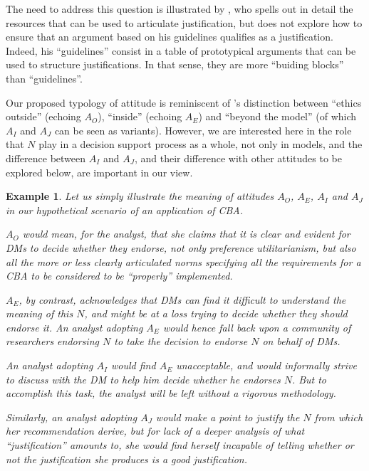 \documentclass[preprint, french, english, 11pt, authoryear]{elsarticle}%
\newtheorem{example}{Example}
\begin{document}
\begin{changebar}The need to address this question is illustrated by \citet{jackson_towards_1999}, who spells out in detail the resources that can be used to articulate justification, but does not explore how to ensure that an argument based on his guidelines qualifies as a justification.
Indeed, his ``guidelines'' consist in a table of prototypical arguments that can be used to structure justifications. In that sense, they are more ``buiding blocks'' than ``guidelines''.

Our proposed typology of attitude is reminiscent of \citet{le_menestrel_ethics_2004}'s distinction between ``ethics outside'' (echoing $A_O$), ``inside'' (echoing $A_E$) and ``beyond the model'' (of which $A_I$ and $A_J$ can be seen as variants). 
However, we are interested here in the role that $N$ play in a decision support process as a whole, not only in models, and the difference between $A_I$ and $A_J$, and their difference with other attitudes to be explored below, are important in our view. 

\end{changebar}


\begin{example}
Let us simply illustrate the meaning of attitudes $A_O$, $A_E$, $A_I$ and $A_J$ in our hypothetical scenario of an application of \ac{CBA}.

$A_O$ would mean, for the analyst, that she claims that it is clear and evident for \acp{DM} to decide whether they endorse, not only preference utilitarianism, but also all the more or less clearly articulated norms specifying all the requirements for a \ac{CBA} to be considered to be ``properly'' implemented.

$A_E$, by contrast, acknowledges that \acp{DM} can find it difficult to understand the meaning of this $N$, and might be at a loss trying to decide whether they should endorse it. 
An analyst adopting $A_E$ would hence fall back upon a community of researchers endorsing $N$ to take the decision to endorse $N$ on behalf of \acp{DM}.

An analyst adopting $A_I$ would find $A_E$ unacceptable, and would informally strive to discuss with the \ac{DM} to help him decide whether he endorses $N$. But to accomplish this task, the analyst will be left without a rigorous methodology.
\begin{changebar}
Similarly, an analyst adopting $A_J$ would make a point to justify the $N$ from which her recommendation derive, but for lack of a deeper analysis of what ``justification'' amounts to, she would find herself incapable of telling whether or not the justification she produces is a good justification.
\end{changebar}
\end{example}
\end{document}
